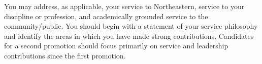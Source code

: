 You may address, as applicable, your service to Northeastern, service to your discipline or profession, and academically grounded service to the community/public. 
You should begin with a statement of your service philosophy and identify the areas in which you have made strong contributions. 
Candidates for a second promotion should focus primarily on service and leadership contributions since the first promotion.
